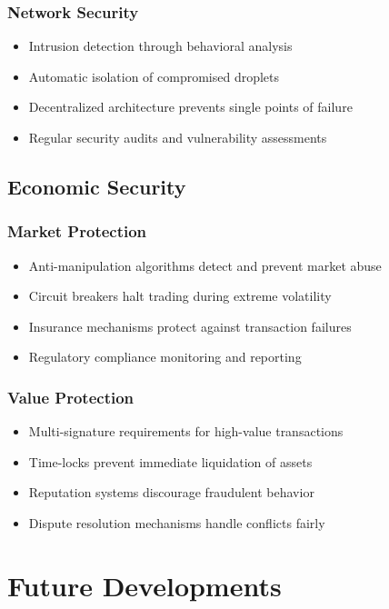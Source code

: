 \documentclass[11pt,a4paper]{article}
\begin{document}
\subsubsection{Network Security}
\begin{itemize}
    \item Intrusion detection through behavioral analysis
    \item Automatic isolation of compromised droplets
    \item Decentralized architecture prevents single points of failure
    \item Regular security audits and vulnerability assessments
\end{itemize}

\subsection{Economic Security}

\subsubsection{Market Protection}
\begin{itemize}
    \item Anti-manipulation algorithms detect and prevent market abuse
    \item Circuit breakers halt trading during extreme volatility
    \item Insurance mechanisms protect against transaction failures
    \item Regulatory compliance monitoring and reporting
\end{itemize}

\subsubsection{Value Protection}
\begin{itemize}
    \item Multi-signature requirements for high-value transactions
    \item Time-locks prevent immediate liquidation of assets
    \item Reputation systems discourage fraudulent behavior
    \item Dispute resolution mechanisms handle conflicts fairly
\end{itemize}

\section{Future Developments}
\end{document}
